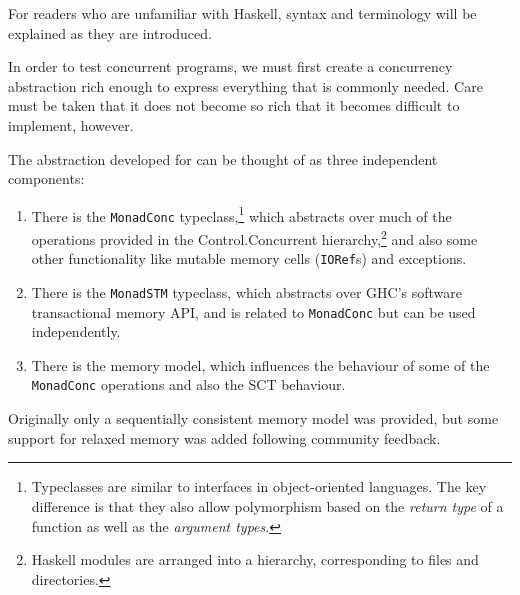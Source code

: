 For readers who are unfamiliar with Haskell, syntax and terminology
will be explained as they are introduced.

In order to test concurrent programs, we must first create a
concurrency abstraction rich enough to express everything that is
commonly needed. Care must be taken that it does not become so rich
that it becomes difficult to implement, however.

The abstraction developed for \dejafu{} can be thought of as three
independent components:

\begin{enumerate}
\item There is the \verb|MonadConc| typeclass,\footnote{Typeclasses
    are similar to interfaces in object-oriented languages. The key
    difference is that they also allow polymorphism based on the
    \emph{return type} of a function as well as the \emph{argument
      types}.} which abstracts over much of the operations provided in
  the Control.Concurrent hierarchy,\footnote{Haskell modules are
    arranged into a hierarchy, corresponding to files and
    directories.} and also some other functionality like mutable
  memory cells (\verb|IORef|s) and exceptions.

\item There is the \verb|MonadSTM| typeclass, which abstracts over
  GHC's software transactional memory API, and is related to
  \verb|MonadConc| but can be used independently.

\item There is the memory model, which influences the behaviour of
  some of the \verb|MonadConc| operations and also the SCT behaviour.
\end{enumerate}

Originally only a sequentially consistent memory model was provided,
but some support for relaxed memory was added following community
feedback.
